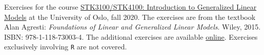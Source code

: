 Exercises for the course \href{https://www.uio.no/studier/emner/matnat/math/STK3100/}{STK3100/STK4100: Introduction to Generalized Linear Models} at the University of Oslo, fall 2020. The exercises are from the textbook Alan Agresti: \textit{Foundations of Linear and Generalized Linear Models}. Wiley, 2015. ISBN: 978-1-118-73003-4. The additional exercises are available \href{https://www.uio.no/studier/emner/matnat/math/STK3100/h20/oppgaver.html}{online}. Exercises exclusively involving \texttt{R} are not covered.
